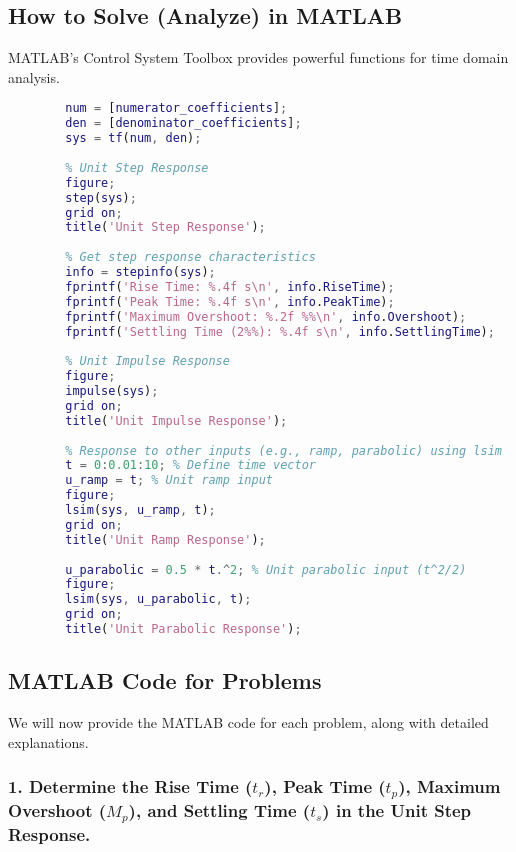 \documentclass[a4paper,12pt]{article}
\begin{document}
	\subsection*{How to Solve (Analyze) in MATLAB}
	
	MATLAB's Control System Toolbox provides powerful functions for time domain analysis.
	
	\begin{lstlisting}[language=Matlab, caption=General MATLAB usage for Time Domain Analysis]
		% Define the system (e.g., as a transfer function)
		num = [numerator_coefficients];
		den = [denominator_coefficients];
		sys = tf(num, den);
		
		% Unit Step Response
		figure;
		step(sys);
		grid on;
		title('Unit Step Response');
		
		% Get step response characteristics
		info = stepinfo(sys);
		fprintf('Rise Time: %.4f s\n', info.RiseTime);
		fprintf('Peak Time: %.4f s\n', info.PeakTime);
		fprintf('Maximum Overshoot: %.2f %%\n', info.Overshoot);
		fprintf('Settling Time (2%%): %.4f s\n', info.SettlingTime);
		
		% Unit Impulse Response
		figure;
		impulse(sys);
		grid on;
		title('Unit Impulse Response');
		
		% Response to other inputs (e.g., ramp, parabolic) using lsim
		t = 0:0.01:10; % Define time vector
		u_ramp = t; % Unit ramp input
		figure;
		lsim(sys, u_ramp, t);
		grid on;
		title('Unit Ramp Response');
		
		u_parabolic = 0.5 * t.^2; % Unit parabolic input (t^2/2)
		figure;
		lsim(sys, u_parabolic, t);
		grid on;
		title('Unit Parabolic Response');
	\end{lstlisting}
	
	\subsection*{MATLAB Code for Problems}
	
	We will now provide the MATLAB code for each problem, along with detailed explanations.
	
	\subsubsection*{1. Determine the Rise Time ($t_r$), Peak Time ($t_p$), Maximum Overshoot ($M_p$), and Settling Time ($t_s$) in the Unit Step Response.}
	
\end{document}
